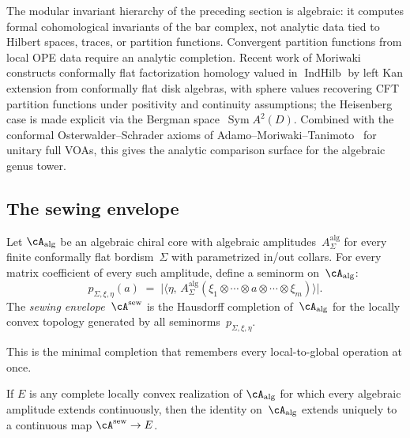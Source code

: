 The modular invariant hierarchy of the preceding section is algebraic:
it computes formal cohomological invariants of the bar complex, not
analytic data tied to Hilbert spaces, traces, or partition functions.
Convergent partition functions from local OPE data require an analytic
completion. Recent work of
Moriwaki~\cite{Moriwaki26a, Moriwaki26b} constructs conformally flat
factorization homology valued in $\operatorname{IndHilb}$ by left Kan
extension from conformally flat disk algebras, with sphere values
recovering CFT partition functions under positivity and continuity
assumptions; the Heisenberg case is made explicit via the Bergman
space~$\operatorname{Sym} A^2(D)$. Combined with the conformal
Osterwalder--Schrader axioms of
Adamo--Moriwaki--Tanimoto~\cite{AMT24} for unitary full VOAs, this
gives the analytic comparison surface for the algebraic genus tower.

\subsection{The sewing envelope}\label{subsec:sewing-envelope}

\begin{definition}%
\label{def:sewing-envelope}%
\ClaimStatusDefinitional
Let $\cA_{\mathrm{alg}}$ be an algebraic chiral core with algebraic
amplitudes~$A_\Sigma^{\mathrm{alg}}$ for every finite conformally
flat bordism~$\Sigma$ with parametrized in/out collars. For every
matrix coefficient of every such amplitude, define a seminorm
on~$\cA_{\mathrm{alg}}$:
\[
p_{\Sigma,\xi,\eta}(a)
\;=\;
\bigl|\langle \eta,\,
A_\Sigma^{\mathrm{alg}}
(\xi_1 \otimes \cdots \otimes a \otimes \cdots \otimes \xi_m)
\rangle\bigr|.
\]
The \emph{sewing envelope}~$\cA^{\mathrm{sew}}$ is the Hausdorff
completion of~$\cA_{\mathrm{alg}}$ for the locally convex topology
generated by all seminorms~$p_{\Sigma,\xi,\eta}$.
\end{definition}

This is the minimal completion that remembers every local-to-global
operation at once.

\begin{proposition}\label{prop:sewing-universal-property}%
%
If $E$ is any complete locally convex realization of\/
$\cA_{\mathrm{alg}}$ for which every algebraic amplitude extends
continuously, then the identity on~$\cA_{\mathrm{alg}}$ extends
uniquely to a continuous map
$\cA^{\mathrm{sew}} \to E$.
\end{proposition}

